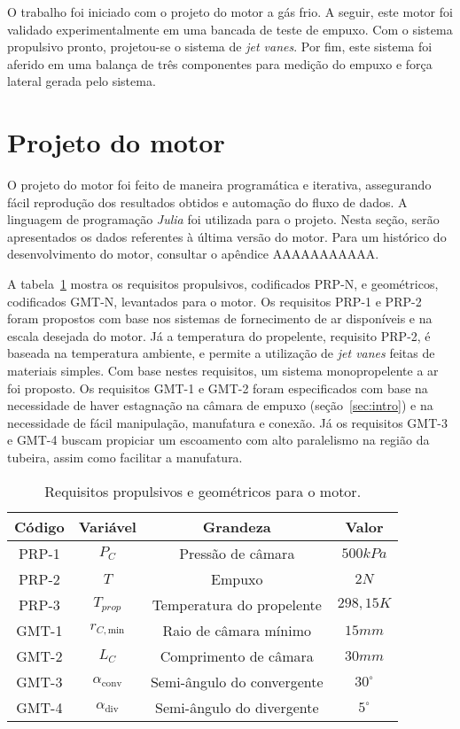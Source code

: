
O trabalho foi iniciado com o projeto do motor a gás frio. A seguir, este motor foi validado experimentalmente em uma bancada de teste de empuxo. Com o sistema propulsivo pronto, projetou-se o sistema de \textit{jet vanes}. Por fim, este sistema foi aferido em uma balança de três componentes para medição do empuxo e força lateral gerada pelo sistema. 

\section{Projeto do motor}

O projeto do motor foi feito de maneira programática e iterativa, assegurando fácil reprodução dos resultados obtidos e automação do fluxo de dados. A linguagem de programação \textit{Julia} foi utilizada para o projeto. Nesta seção, serão apresentados os dados referentes à última versão do motor. Para um histórico do desenvolvimento do motor, consultar o apêndice AAAAAAAAAAA.  

A tabela~\ref{tab:requirements} mostra os requisitos propulsivos, codificados PRP-N, e geométricos, codificados GMT-N, levantados para o motor. Os requisitos PRP-1 e PRP-2 foram propostos com base nos sistemas de fornecimento de ar disponíveis e na escala desejada do motor. Já a temperatura do propelente, requisito PRP-2, é baseada na temperatura ambiente, e permite a utilização de \textit{jet vanes} feitas de materiais simples. Com base nestes requisitos, um sistema monopropelente a ar foi proposto. Os requisitos GMT-1 e GMT-2 foram especificados com base na necessidade de haver estagnação na câmara de empuxo (seção~\ref{sec:intro}) e na necessidade de fácil manipulação, manufatura e conexão. Já os requisitos GMT-3 e GMT-4 buscam propiciar um escoamento com alto paralelismo na região da tubeira, assim como facilitar a manufatura.

\begin{table}[]
    \centering\begin{tabular}{cccc} \toprule
        Código & Variável & Grandeza & Valor \\ \midrule
        PRP-1 & \(P_C\) & Pressão de câmara & \(500kPa\) \\
        PRP-2 & \(T\) & Empuxo & \(2N\) \\
        PRP-3 &\(T_{prop}\) & Temperatura do propelente & \(298,15K\) \\
        GMT-1 & \(r_{C,\text{min}}\) & Raio de câmara mínimo & \(15mm\) \\
        GMT-2 & \(L_C\) & Comprimento de câmara & \(30mm\) \\
        GMT-3 & \(\alpha_{\text{conv}}\) & Semi-ângulo do convergente & \(30^\circ \) \\
        GMT-4 & \(\alpha_{\text{div}}\) & Semi-ângulo do divergente & \(5^\circ \) \\ \bottomrule 
    \end{tabular}
    \caption{Requisitos propulsivos e geométricos para o motor.}
    \label{tab:requirements}
\end{table}

